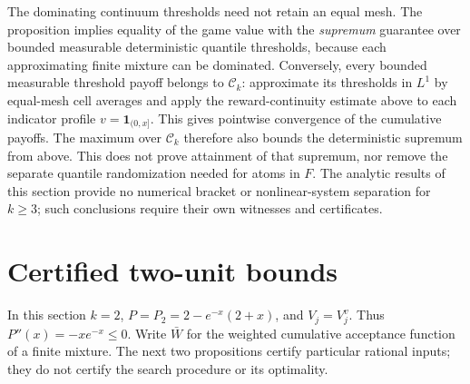 \documentclass[11pt]{article}
\theoremstyle{remark}
\begin{document}
The dominating continuum thresholds need not retain an equal mesh.
The proposition implies equality of the game value with the
\emph{supremum} guarantee over bounded measurable deterministic
quantile thresholds, because each approximating finite mixture can
be dominated. Conversely, every bounded measurable threshold payoff
belongs to $\mathcal C_k$: approximate its thresholds in $L^1$ by
equal-mesh cell averages and apply the reward-continuity estimate above
to each indicator profile $v=\mathbf1_{(0,x]}$. This gives pointwise
convergence of the cumulative payoffs. The maximum over $\mathcal C_k$
therefore also bounds the deterministic supremum from above.
This does not prove attainment of that supremum, nor
remove the separate quantile randomization needed for atoms in $F$.
The analytic results of this section provide no numerical bracket or
nonlinear-system separation for $k\ge3$; such conclusions require
their own witnesses and certificates.

\section{Certified two-unit bounds}\label{sec:certificates}
In this section $k=2$, $P=P_2=2-e^{-x}(2+x)$, and $V_j=V_j^v$.
Thus $P''(x)=-xe^{-x}\le0$. Write $\bar W$ for the weighted cumulative
acceptance function of a finite mixture. The next two propositions
certify particular rational inputs; they do not certify the search
procedure or its optimality.
\end{document}
